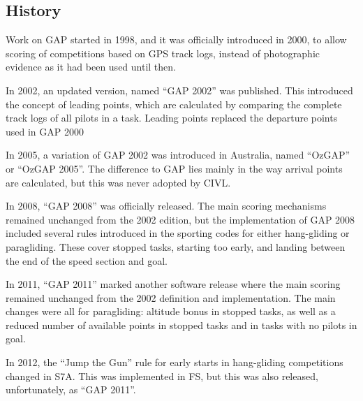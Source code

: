 \documentclass{article}
\begin{document}
\subsection{History}
Work on GAP started in 1998, and it was officially introduced in 2000, to allow
scoring of competitions based on GPS track logs, instead of photographic
evidence as it had been used until then.

In 2002, an updated version, named “GAP 2002” was published. This introduced
the concept of leading points, which are calculated by comparing the complete
track logs of all pilots in a task. Leading points replaced the departure
points used in GAP 2000

In 2005, a variation of GAP 2002 was introduced in Australia, named “OzGAP” or
“OzGAP 2005”. The difference to GAP lies mainly in the way arrival points are
calculated, but this was never adopted by CIVL.

In 2008, “GAP 2008” was officially released. The main scoring mechanisms
remained unchanged from the 2002 edition, but the implementation of GAP 2008
included several rules introduced in the sporting codes for either hang-gliding
or paragliding. These cover stopped tasks, starting too early, and landing
between the end of the speed section and goal.

In 2011, “GAP 2011” marked another software release where the main scoring
remained unchanged from the 2002 definition and implementation. The main
changes were all for paragliding: altitude bonus in stopped tasks, as well as
a reduced number of available points in stopped tasks and in tasks with no
pilots in goal.

In 2012, the “Jump the Gun” rule for early starts in hang-gliding competitions
changed in S7A. This was implemented in FS, but this was also released,
unfortunately, as “GAP 2011”.
\end{document}
